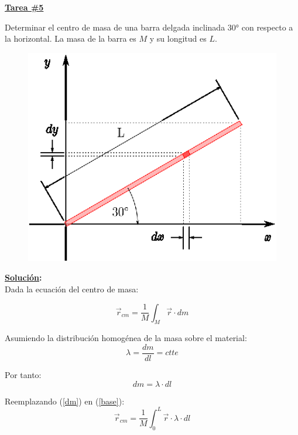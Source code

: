 \documentclass[letter,11pt]{article}
\begin{document}
\begin{center}
    {\Large \bf{\underline{Tarea \#5}}}
\end{center}

Determinar el centro de masa de una barra delgada inclinada $30\si{\degree}$ con
respecto a la horizontal. La masa de la barra es $M$ y su longitud es $L$.

\begin{figure}[!h]
\centering
\includegraphics[scale=1.20]{resources/f1.eps}
\end{figure}

\vspace{1.0cm}
\textbf{\underline{Solución}:} \\

Dada la ecuación del centro de masa:

\begin{equation}
    \vec{r}_{cm} = \frac{1}{M} \int_{M} \vec{r} \cdot dm
\label{base}
\end{equation}

Asumiendo la distribución homogénea de la masa sobre el material:
\begin{equation*}
    \lambda = \frac{dm}{dl} = ctte
\end{equation*}

Por tanto:
\begin{equation}
    dm = \lambda \cdot dl
\label{dm}
\end{equation}

Reemplazando (\ref{dm}) en (\ref{base}):
\begin{equation*}
    \vec{r}_{cm} = \frac{1}{M} \int_{0}^{L} \vec{r} \cdot \lambda \cdot dl
\end{equation*}
\end{document}
